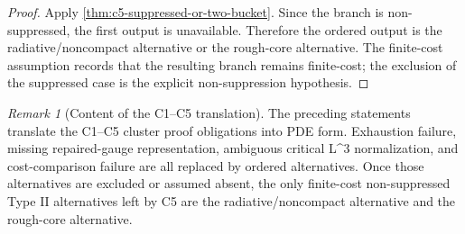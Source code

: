 \documentclass[11pt]{amsart}
\def\({}%
\def\){}%
\theoremstyle{plain}
\theoremstyle{definition}
\theoremstyle{remark}
\newtheorem{remark}[theorem]{Remark}
\begin{document}
\begin{proof}
Apply \cref{thm:c5-suppressed-or-two-bucket}.  Since the branch is
non-suppressed, the first output is unavailable.  Therefore the ordered output
is the radiative/noncompact alternative or the rough-core alternative.  The
finite-cost assumption records that the resulting branch remains finite-cost;
the exclusion of the suppressed case is the explicit
non-suppression hypothesis.
\end{proof}

\begin{remark}[Content of the C1--C5 translation]
The preceding statements translate the C1--C5 cluster proof obligations into
PDE form.  Exhaustion failure, missing repaired-gauge representation,
ambiguous critical \(L^3\) normalization, and cost-comparison failure are all
replaced by ordered alternatives.  Once those alternatives are excluded or
assumed absent, the only finite-cost non-suppressed Type II alternatives left
by C5 are the radiative/noncompact alternative and the rough-core alternative.
\end{remark}

\clearpage


\end{document}
